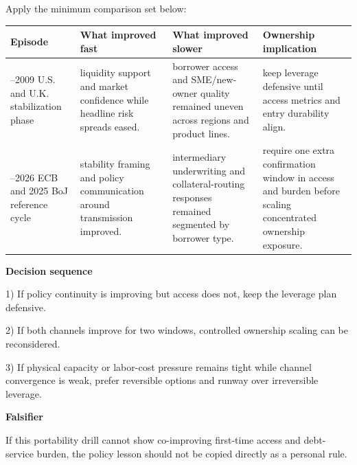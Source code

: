 \documentclass[11pt,openany]{book}
\begin{document}
Apply the minimum comparison set below:

\begin{center}
\small
\begin{tabularx}{\textwidth}{>{\raggedright\arraybackslash}p{}>{\raggedright\arraybackslash}p{}>{\raggedright\arraybackslash}p{}X}
\toprule
\textbf{Episode} & \textbf{What improved fast} & \textbf{What improved slower} & \textbf{Ownership implication} \\
\midrule
2008--2009 U.S. and U.K. stabilization phase & liquidity support and market confidence while headline risk spreads eased. & borrower access and SME/new-owner quality remained uneven across regions and product lines. & keep leverage defensive until access metrics and entry durability align. \\
2025--2026 ECB and 2025 BoJ reference cycle & stability framing and policy communication around transmission improved. & intermediary underwriting and collateral-routing responses remained segmented by borrower type. & require one extra confirmation window in access and burden before scaling concentrated ownership exposure. \\
\bottomrule
\end{tabularx}
\normalsize
\end{center}

\begin{signalbox}
\textbf{Decision sequence}\par
1) If policy continuity is improving but access does not, keep the leverage plan defensive.\par
2) If both channels improve for two windows, controlled ownership scaling can be reconsidered.\par
3) If physical capacity or labor-cost pressure remains tight while channel convergence is weak, prefer reversible options and runway over irreversible leverage.\par
\end{signalbox}

\begin{notebox}
\textbf{Falsifier}\par
If this portability drill cannot show co-improving first-time access and debt-service burden, the policy lesson should not be copied directly as a personal rule.
\end{notebox}
\end{document}
